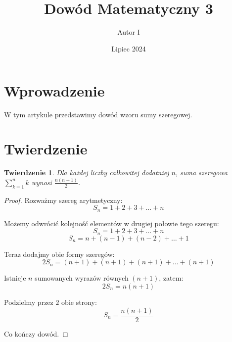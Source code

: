 \documentclass{article}
\title{Dowód Matematyczny 3}
\author{Autor I}
\date{Lipiec 2024}
\theoremstyle{plain}
\newtheorem{theorem}{Twierdzenie}
\begin{document}
\maketitle

\section{Wprowadzenie}

W tym artykule przedstawimy dowód wzoru sumy szeregowej.

\section{Twierdzenie}

\begin{theorem}
Dla każdej liczby całkowitej dodatniej $n$, suma szeregowa $\sum_{k=1}^{n} k$ wynosi $\frac{n(n+1)}{2}$.
\end{theorem}

\begin{proof}
Rozważmy szereg arytmetyczny:
\[ S_n = 1 + 2 + 3 + \ldots + n \]

Możemy odwrócić kolejność elementów w drugiej połowie tego szeregu:
\[ S_n = 1 + 2 + 3 + \ldots + n \]
\[ S_n = n + (n-1) + (n-2) + \ldots + 1 \]

Teraz dodajmy obie formy szeregów:
\[ 2S_n = (n+1) + (n+1) + (n+1) + \ldots + (n+1) \]

Istnieje $n$ sumowanych wyrazów równych $(n+1)$, zatem:
\[ 2S_n = n(n+1) \]

Podzielmy przez $2$ obie strony:
\[ S_n = \frac{n(n+1)}{2} \]

Co kończy dowód.
\end{proof}
\end{document}
